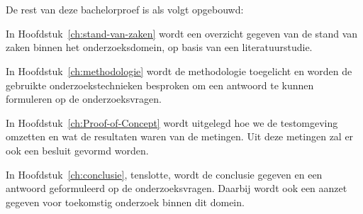 \section{}%
\label{sec:opzet-bachelorproef}


De rest van deze bachelorproef is als volgt opgebouwd:

In Hoofdstuk~\ref{ch:stand-van-zaken} wordt een overzicht gegeven van de stand van zaken binnen het onderzoeksdomein, op basis van een literatuurstudie.

In Hoofdstuk~\ref{ch:methodologie} wordt de methodologie toegelicht en worden de gebruikte onderzoekstechnieken besproken om een antwoord te kunnen formuleren op de onderzoeksvragen.




In Hoofdstuk~\ref{ch:Proof-of-Concept} wordt uitgelegd hoe we de testomgeving omzetten en wat de resultaten waren van de metingen. Uit deze metingen zal er ook een besluit gevormd worden.

In Hoofdstuk~\ref{ch:conclusie}, tenslotte, wordt de conclusie gegeven en een antwoord geformuleerd op de onderzoeksvragen. Daarbij wordt ook een aanzet gegeven voor toekomstig onderzoek binnen dit domein.